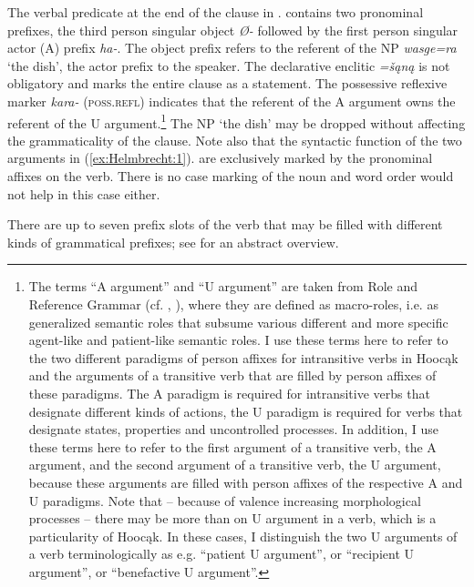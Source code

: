 \documentclass[output=paper]{langscibook}
\begin{document}
The verbal predicate at the end of the clause in . contains two pronominal prefixes, the third person singular object \textit{Ø-} followed by the first person singular actor (A) prefix \textit{ha-}. The object prefix refers to the referent of the NP \textit{wasge=ra} `the dish', the actor prefix to the speaker. The declarative enclitic \textit{=šąną} is not obligatory and marks the entire clause as a statement. The possessive reflexive marker \textit{kara-} (\textsc{poss.refl}) indicates that the referent of the A argument owns the referent of the U argument.\footnote{The terms “A argument” and “U argument” are taken from Role and Reference Grammar (cf. \citealt{Vanvalin1997}, \citealt{Vanvalin2013}), where they are defined as macro-roles, i.e. as generalized semantic roles that subsume various different and more specific agent-like and patient-like semantic roles. I use these terms here to refer to the two different paradigms of person affixes for intransitive verbs in Hoocąk and the arguments of a transitive verb that are filled by person affixes of these paradigms. The A paradigm is required for intransitive verbs that designate different kinds of actions, the U paradigm is required for verbs that designate states, properties and uncontrolled processes. In addition, I use these terms here to refer to the first argument of a transitive verb, the A argument, and the second argument of a transitive verb, the U argument, because these arguments are filled with person affixes of the respective A and U paradigms. Note that – because of valence increasing morphological processes – there may be more than on U argument in a verb, which is a particularity of Hoocąk. In these cases, I distinguish the two U arguments of a verb terminologically as e.g. “patient U argument”, or “recipient U argument”, or “benefactive U argument”.} The NP `the dish' may be dropped without affecting the grammaticality of the clause. Note also that the syntactic function of the two arguments in (\ref{ex:Helmbrecht:1}). are exclusively marked by the pronominal affixes on the verb. There is no case marking of the noun and word order would not help in this case either. 

There are up to seven prefix slots of the verb that may be filled with different kinds of grammatical prefixes; see  for an abstract overview.
\end{document}
